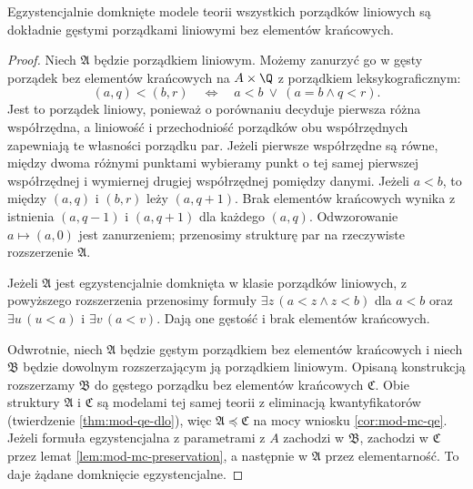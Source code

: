 \begin{przyklad}
\label{ex:mod-mc-ec-dlo}
Egzystencjalnie domknięte modele teorii wszystkich
porządków liniowych są dokładnie gęstymi porządkami
liniowymi bez elementów krańcowych.
\begin{proof}
Niech $\mathfrak A$ będzie porządkiem liniowym.
Możemy zanurzyć go w gęsty porządek bez elementów
krańcowych na $A\times\Q$ z porządkiem leksykograficznym:
\[
(a,q)<(b,r)
\quad\Longleftrightarrow\quad
a<b\ \lor\ (a=b\land q<r).
\]
Jest to porządek liniowy, ponieważ o porównaniu
decyduje pierwsza różna współrzędna, a liniowość
i przechodniość porządków obu współrzędnych
zapewniają te własności porządku par.
Jeżeli pierwsze współrzędne są równe, między
dwoma różnymi punktami wybieramy punkt o tej samej
pierwszej współrzędnej i wymiernej drugiej współrzędnej
pomiędzy danymi. Jeżeli $a<b$, to między
$(a,q)$ i $(b,r)$ leży $(a,q+1)$.
Brak elementów krańcowych wynika z istnienia
$(a,q-1)$ i $(a,q+1)$ dla każdego $(a,q)$.
Odwzorowanie $a\mapsto(a,0)$ jest zanurzeniem;
przenosimy strukturę par na rzeczywiste rozszerzenie
$\mathfrak A$.

Jeżeli $\mathfrak A$ jest egzystencjalnie domknięta
w klasie porządków liniowych, z powyższego rozszerzenia
przenosimy formuły
$\exists z\,(a<z\land z<b)$ dla $a<b$ oraz
$\exists u\,(u<a)$ i $\exists v\,(a<v)$.
Dają one gęstość i brak elementów krańcowych.

Odwrotnie, niech $\mathfrak A$ będzie gęstym porządkiem
bez elementów krańcowych i niech $\mathfrak B$
będzie dowolnym rozszerzającym ją porządkiem liniowym.
Opisaną konstrukcją rozszerzamy $\mathfrak B$
do gęstego porządku bez elementów krańcowych
$\mathfrak C$. Obie struktury $\mathfrak A$ i
$\mathfrak C$ są modelami tej samej teorii z eliminacją
kwantyfikatorów (twierdzenie \ref{thm:mod-qe-dlo}),
więc $\mathfrak A\preccurlyeq\mathfrak C$ na mocy
wniosku \ref{cor:mod-mc-qe}. Jeżeli formuła egzystencjalna
z parametrami z $A$ zachodzi w $\mathfrak B$, zachodzi
w $\mathfrak C$ przez lemat \ref{lem:mod-mc-preservation},
a następnie w $\mathfrak A$ przez elementarność.
To daje żądane domknięcie egzystencjalne.
\end{proof}
\end{przyklad}

